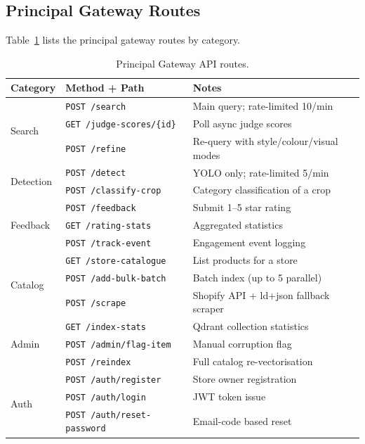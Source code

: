 \documentclass[12pt]{article}
\begin{document}
\subsection{Principal Gateway Routes}

Table~\ref{tab:gw-routes} lists the principal gateway routes by category.

\begin{table}[H]
\centering
\small
\begin{tabular}{@{}ll>{\RaggedRight\arraybackslash}p{6cm}@{}}
\toprule
\textbf{Category} & \textbf{Method + Path} & \textbf{Notes} \\ \midrule
\multirow{3}{*}{Search}
  & \texttt{POST /search}              & Main query; rate-limited 10/min \\
  & \texttt{GET  /judge-scores/\{id\}} & Poll async judge scores \\
  & \texttt{POST /refine}              & Re-query with style/colour/visual modes \\ \midrule
\multirow{2}{*}{Detection}
  & \texttt{POST /detect}              & YOLO only; rate-limited 5/min \\
  & \texttt{POST /classify-crop}       & Category classification of a crop \\ \midrule
\multirow{3}{*}{Feedback}
  & \texttt{POST /feedback}            & Submit 1--5 star rating \\
  & \texttt{GET  /rating-stats}        & Aggregated statistics \\
  & \texttt{POST /track-event}         & Engagement event logging \\ \midrule
\multirow{3}{*}{Catalog}
  & \texttt{GET  /store-catalogue}     & List products for a store \\
  & \texttt{POST /add-bulk-batch}      & Batch index (up to 5 parallel) \\
  & \texttt{POST /scrape}              & Shopify API + ld+json fallback scraper \\ \midrule
\multirow{3}{*}{Admin}
  & \texttt{GET  /index-stats}         & Qdrant collection statistics \\
  & \texttt{POST /admin/flag-item}     & Manual corruption flag \\
  & \texttt{POST /reindex}             & Full catalog re-vectorisation \\ \midrule
\multirow{3}{*}{Auth}
  & \texttt{POST /auth/register}       & Store owner registration \\
  & \texttt{POST /auth/login}          & JWT token issue \\
  & \texttt{POST /auth/reset-password} & Email-code based reset \\ \bottomrule
\end{tabular}
\caption{Principal Gateway API routes.}
\label{tab:gw-routes}
\end{table}
\end{document}
